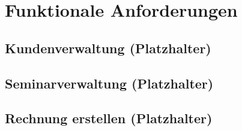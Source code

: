 \section{Funktionale Anforderungen}

\subsection{Kundenverwaltung (Platzhalter)}

\subsection{Seminarverwaltung (Platzhalter)}

\subsection{Rechnung erstellen (Platzhalter)}